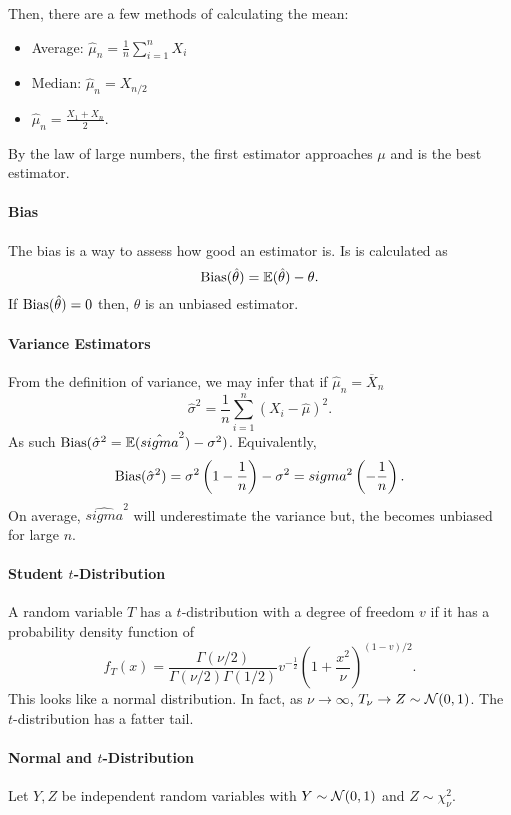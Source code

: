 Then, there are a few methods of calculating the mean:
\begin{itemize}
  \item Average: \(\hat{\mu}_n = \frac{1}{n} \sum_{i=1}^n X_i \)
  \item Median: \(\hat{\mu}_n = X_{n/2}\)
  \item  \(\hat{\mu}_n = \frac{X_1 + X_n}{2}\).
\end{itemize}
By the law of large numbers, the first estimator approaches \(\mu\) and
is the best estimator.

\paragraph{Bias}
The bias is a way to assess how good an estimator is.
Is is calculated as \[
  \mathrm{Bias}(\hat{\theta}) = \mathbb{E}(\hat{\theta}) - \theta
.\] 
If  \(\mathrm{Bias}(\hat{\theta}) = 0\) then, \(\theta\) is an unbiased estimator.

\paragraph{Variance Estimators}
From the definition of variance, we may infer that if \(\hat{\mu}_n = \overline{X}_n\) \[
  \hat{\sigma}^2 = \frac{1}{n} \sum_{i=1}^n (X_i - \hat{\mu})^2
.\] 
As such \(\mathrm{Bias}(\hat{\sigma}^2 = \mathbb{E}(\hat{sigma}^2) - \sigma^2)\). Equivalently, \[
  \mathrm{Bias}(\hat{\sigma}^2) = \sigma^2 \left( 1-\frac{1}{n} \right)  - \sigma^2
  = sigma^2\left(  - \frac{1}{n} \right) 
.\] 
On average, \(\hat{sigma}^2\) will underestimate the variance but,
the becomes unbiased for large \(n\).

\paragraph{Student \(t\)-Distribution}
A random variable \(T\) has a \(t\)-distribution with a degree
of freedom  \(v\) if it has a probability density function of \[
  f_T(x) = \frac{\Gamma(\nu/2)}{\Gamma(\nu/2)\Gamma(1/2)}
  v^{-\frac{1}{2}} \left( 1 + \frac{x^2}{\nu} \right)^{(1-v)/2}
.\] 
This looks like a normal distribution. In fact, as \(\nu \to  \infty\),
\(T_\nu \to Z \sim \mathcal{N}(0, 1)\). The \(t\)-distribution has
a fatter tail.

\paragraph{Normal and \(t\)-Distribution}
Let \(Y, Z\) be independent random variables with
\(Y \sim \mathcal{N}(0, 1)\) and \(Z \sim \chi_\nu^2\).

